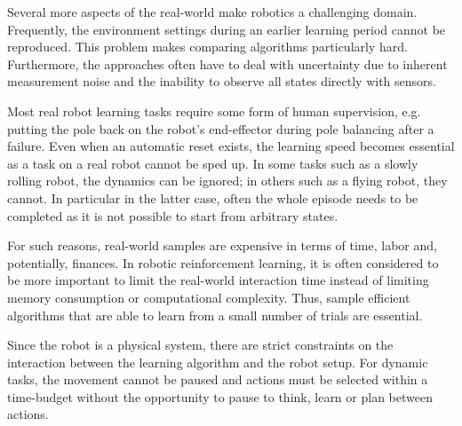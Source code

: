 Several more aspects of the real-world make robotics a challenging domain. Frequently, the environment settings during an earlier 
learning period cannot be reproduced. This problem makes comparing algorithms particularly hard. Furthermore, the approaches often have to deal 
with uncertainty due to inherent measurement noise and the inability to observe all states directly with sensors.

Most real robot learning tasks require some form of human supervision, e.g. putting the pole back on the robot's end-effector during pole balancing
 after a failure. Even when an automatic reset exists, the learning speed becomes essential as a task on a real robot cannot be sped up.
In some tasks such as a slowly rolling robot, the dynamics can be ignored; in others such as a flying robot, they cannot. In particular in the latter case,
often the whole episode needs to be completed as it is not possible to start from arbitrary states.

For such reasons, real-world samples are expensive in terms of time, labor and, potentially, finances. In robotic reinforcement learning,
it is often considered to be more important to limit the real-world interaction time instead of limiting memory consumption or computational complexity.
Thus, sample efficient algorithms that are able to learn from a small number of trials are essential.

Since the robot is a physical system, there are strict constraints on the interaction between the learning algorithm
and the robot setup. For dynamic tasks, the movement cannot be paused and actions must be selected within a time-budget without 
the opportunity to pause to think, learn or plan between actions.

